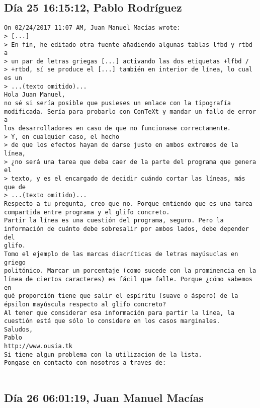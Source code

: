 \documentclass[a4paper,10pt]{article}
\begin{document}
\subsection{Día 25 16:15:12, Pablo Rodríguez}

\begin{lstlisting}
On 02/24/2017 11:07 AM, Juan Manuel Macías wrote:
> [...]
> En fin, he editado otra fuente añadiendo algunas tablas lfbd y rtbd a
> un par de letras griegas [...] activando las dos etiquetas +lfbd /
> +rtbd, sí se produce el [...] también en interior de línea, lo cual es un
> ...(texto omitido)...
Hola Juan Manuel,
no sé si sería posible que pusieses un enlace con la tipografía
modificada. Sería para probarlo con ConTeXt y mandar un fallo de error a
los desarrolladores en caso de que no funcionase correctamente.
> Y, en cualquier caso, el hecho 
> de que los efectos hayan de darse justo en ambos extremos de la línea, 
> ¿no será una tarea que deba caer de la parte del programa que genera el 
> texto, y es el encargado de decidir cuándo cortar las líneas, más que de 
> ...(texto omitido)...
Respecto a tu pregunta, creo que no. Porque entiendo que es una tarea
compartida entre programa y el glifo concreto.
Partir la línea es una cuestión del programa, seguro. Pero la
información de cuánto debe sobresalir por ambos lados, debe depender del
glifo.
Tomo el ejemplo de las marcas diacríticas de letras mayúsuclas en griego
politónico. Marcar un porcentaje (como sucede con la prominencia en la
línea de ciertos caracteres) es fácil que falle. Porque ¿cómo sabemos en
qué proporción tiene que salir el espíritu (suave o áspero) de la
épsilon mayúscula respecto al glifo concreto?
Al tener que considerar esa información para partir la línea, la
cuestión está que sólo lo considere en los casos marginales.
Saludos,
Pablo
http://www.ousia.tk
Si tiene algun problema con la utilizacion de la lista.
Pongase en contacto con nosotros a traves de:


\end{lstlisting}

\subsection{Día 26 06:01:19, Juan Manuel Macías}
\end{document}
